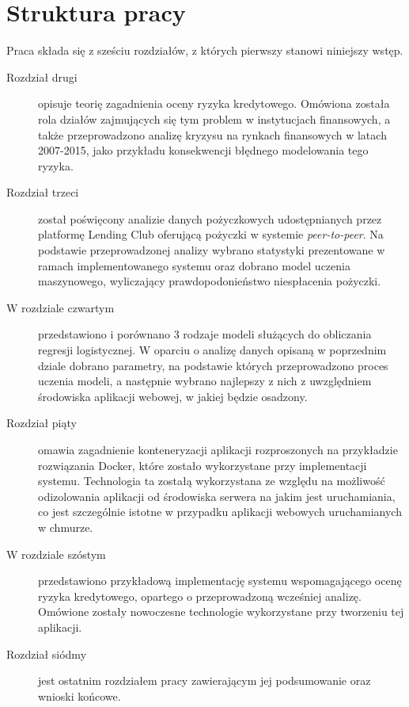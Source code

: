 \section{Struktura pracy}
Praca składa się z sześciu rozdziałów, z których pierwszy stanowi niniejszy wstęp.
\begin{description}
\item [Rozdział drugi] opisuje teorię zagadnienia oceny ryzyka kredytowego. Omówiona została rola działów zajmujących się tym problem w instytucjach finansowych, a także przeprowadzono analizę kryzysu na rynkach finansowych w latach 2007-2015, jako przykładu konsekwencji błędnego modelowania tego ryzyka. 
\item [Rozdział trzeci] został poświęcony analizie danych pożyczkowych udostępnianych przez platformę Lending Club oferującą pożyczki w systemie \textit{peer-to-peer}. Na podstawie przeprowadzonej analizy  wybrano statystyki prezentowane w ramach implementowanego systemu oraz dobrano model uczenia maszynowego, wyliczający prawdopodonieństwo niespłacenia pożyczki.
\item [W rozdziale czwartym] przedstawiono i porównano 3 rodzaje modeli służących do obliczania regresji logistycznej. W oparciu o analizę danych opisaną w poprzednim dziale dobrano parametry, na podstawie których przeprowadzono proces uczenia modeli, a następnie wybrano najlepszy z nich z uwzględniem środowiska aplikacji webowej, w jakiej będzie osadzony. 
\item [Rozdział piąty] omawia zagadnienie konteneryzacji aplikacji rozproszonych na przykładzie rozwiązania Docker, które  zostało wykorzystane przy implementacji systemu. Technologia ta zostałą wykorzystana ze względu na możliwość odizolowania aplikacji od środowiska serwera na jakim jest uruchamiania, co jest szczególnie istotne w przypadku aplikacji webowych uruchamianych w chmurze.
\item [W rozdziale szóstym] przedstawiono przykładową implementację systemu wspomagającego ocenę ryzyka kredytowego, opartego o przeprowadzoną wcześniej analizę. Omówione zostały nowoczesne technologie wykorzystane przy tworzeniu tej aplikacji.
\item [Rozdział siódmy] jest ostatnim rozdziałem pracy zawierającym jej podsumowanie oraz wnioski końcowe. 
\end{description}
 